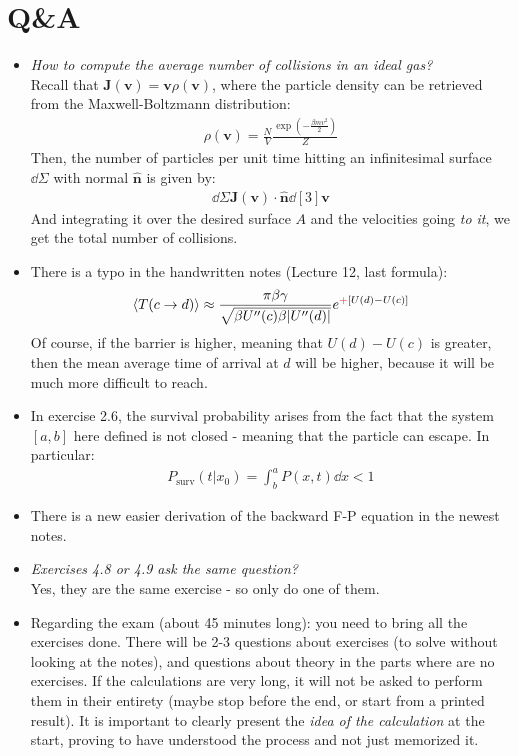 \documentclass[../template.tex]{subfiles}
\begin{document}
\section{Q\&A}

\begin{itemize}
\item \textit{How to compute the average number of collisions in an ideal gas?}\\
Recall that $\bm{J}(\bm{v}) = \bm{v} \rho(\bm{v})$, where the particle density can be retrieved from the Maxwell-Boltzmann distribution:
\begin{align*}
    \rho(\bm{v}) = \frac{N}{V} \frac{\exp\left(-\frac{\beta m v^2}{2} \right)}{Z}  
\end{align*}
Then, the number of particles per unit time hitting an infinitesimal surface $\dd{\Sigma}$ with normal $\bm{\hat{n}}$ is given by:
\begin{align*}
    \dd{\Sigma} \bm{J} (\bm{v}) \cdot \bm{\hat{n}} \dd[3]{\bm{v}}
\end{align*}
And integrating it over the desired surface $A$ and the velocities going \textit{to it}, we get the total number of collisions. 

\item There is a typo in the handwritten notes (Lecture 12, last formula):
\begin{align*}
    \langle T(c \to d) \rangle \approx \frac{\pi \beta \gamma}{\sqrt{\beta U''(c) \beta |U''(d)|}} e^{\textcolor{Red}{+} [U(d) - U(c)]} 
\end{align*}
Of course, if the barrier is higher, meaning that $U(d) - U(c)$ is greater, then the mean average time of arrival at $d$ will be higher, because it will be much more difficult to reach.

\item In exercise 2.6, the survival probability arises from the fact that the system $[a,b]$ here defined is not closed - meaning that the particle can escape. In particular:
\begin{align*}
P_{\mathrm{surv}}(t|x_0) = \int_b^a P(x,t) \dd{x} < 1    
\end{align*}
\item There is a new easier derivation of the backward F-P equation in the newest notes.
\item \textit{Exercises 4.8 or 4.9 ask the same question?} \\
Yes, they are the same exercise - so only do one of them. 
\item Regarding the exam (about 45 minutes long): you need to bring all the exercises done. There will be 2-3 questions about exercises (to solve without looking at the notes), and questions about theory in the parts where are no exercises. If the calculations are very long, it will not be asked to perform them in their entirety (maybe stop before the end, or start from a printed result). It is important to clearly present the \textit{idea of the calculation} at the start, proving to have understood the process and not just memorized it.


\end{itemize}
\end{document}

